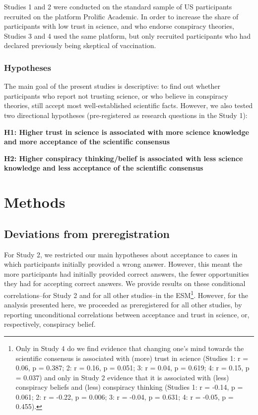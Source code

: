 \documentclass[
  doc,floatsintext]{apa6}
\begin{document}
Studies 1 and 2 were conducted on the standard sample of US participants recruited on the platform Prolific Academic. In order to increase the share of participants with low trust in science, and who endorse conspiracy theories, Studies 3 and 4 used the same platform, but only recruited participants who had declared previously being skeptical of vaccination.

\subsubsection{Hypotheses}\label{hypotheses}

The main goal of the present studies is descriptive: to find out whether participants who report not trusting science, or who believe in conspiracy theories, still accept most well-established scientific facts. However, we also tested two directional hypotheses (pre-registered as research questions in the Study 1):

\textbf{H1: Higher trust in science is associated with more science knowledge and more acceptance of the scientific consensus}

\textbf{H2: Higher conspiracy thinking/belief is associated with less science knowledge and less acceptance of the scientific consensus}

\section{Methods}\label{methods}

\subsection{Deviations from preregistration}\label{deviations-from-preregistration}

For Study 2, we restricted our main hypotheses about acceptance to cases in which participants initially provided a wrong answer. However, this meant the more participants had initially provided correct answers, the fewer opportunities they had for accepting correct answers. We provide results on these conditional correlations--for Study 2 and for all other studies--in the ESM\footnote{Only in Study 4 do we find evidence that changing one's mind towards the scientific consensus is associated with (more) trust in science (Studies 1: r = 0.06, p = 0.387; 2: r = 0.16, p = 0.051; 3: r = 0.04, p = 0.619; 4: r = 0.15, p = 0.037) and only in Study 2 evidence that it is associated with (less) conspiracy beliefs and (less) conspiracy thinking (Studies 1: r = -0.14, p = 0.061; 2: r = -0.22, p = 0.006; 3: r = -0.04, p = 0.631; 4: r = -0.05, p = 0.455).}. However, for the analysis presented here, we proceeded as preregistered for all other studies, by reporting unconditional correlations between acceptance and trust in science, or, respectively, conspiracy belief.
\end{document}
